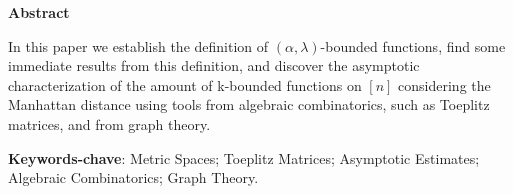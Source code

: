 \begin{center}
  \large \textbf{Abstract}
\end{center}
\vspace{1cm}
\par In this paper we establish the definition of $(\alpha, \lambda)$-bounded functions,
find some immediate results from this definition, and discover the asymptotic characterization of the amount of k-bounded functions on \([n]\) considering the Manhattan distance using tools from algebraic combinatorics, such as Toeplitz matrices, and from graph theory.

\vspace{1cm}

\begin{raggedleft}
  \textbf{Keywords-chave}: Metric Spaces; Toeplitz Matrices; Asymptotic Estimates;
  Algebraic Combinatorics; Graph Theory.
\end{raggedleft}
\newpage
